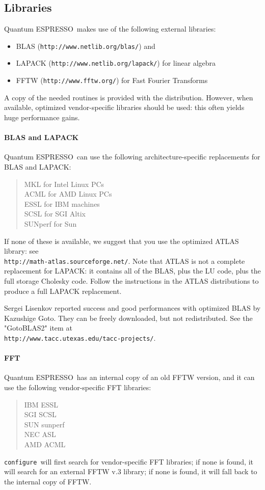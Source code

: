 \documentclass[12pt,a4paper]{article}
\def\qe{{\sc Quantum ESPRESSO}}
\def\configure{\texttt{configure}}
\begin{document}
\subsection{Libraries}
\label{Sec:Libraries}

\qe\ makes use of the following external libraries:
\begin{itemize}
\item BLAS (\texttt{http://www.netlib.org/blas/}) and 
\item LAPACK (\texttt{http://www.netlib.org/lapack/}) for linear algebra 
\item FFTW (\texttt{http://www.fftw.org/}) for Fast Fourier Transforms
\end{itemize}
A copy of the needed routines is provided with the distribution. However,
when available, optimized vendor-specific libraries should be used: this
often yields huge performance gains.

\paragraph{BLAS and LAPACK} 
\qe\ can use the following architecture-specific replacements for BLAS and LAPACK:\\
\begin{quote}
MKL for Intel Linux PCs\\
ACML for AMD Linux PCs\\
ESSL for IBM machines\\
SCSL for SGI Altix\\
SUNperf for Sun
\end{quote}
If none of these is available, we suggest that you use the optimized ATLAS library: see \\
\texttt{http://math-atlas.sourceforge.net/}. Note that ATLAS is not
a complete replacement for LAPACK: it contains all of the BLAS, plus the
LU code, plus the full storage Cholesky code. Follow the instructions in the
ATLAS distributions to produce a full LAPACK replacement.
    
Sergei Lisenkov reported success and good performances with optimized
BLAS by Kazushige Goto. They can be freely downloaded,
but not redistributed. See the "GotoBLAS2" item at\\
\texttt{http://www.tacc.utexas.edu/tacc-projects/}.

\paragraph{FFT}
\qe\ has an internal copy of an old FFTW version, and it 
can use the following vendor-specific FFT libraries:
\begin{quote}
      IBM ESSL\\
      SGI SCSL\\
      SUN sunperf\\
      NEC ASL\\
      AMD ACML
\end{quote}
\configure\ will first search for vendor-specific FFT libraries;
if none is found, it will search for an external FFTW v.3 library;
if none is found, it will fall back to the internal  copy of FFTW.
\end{document}
